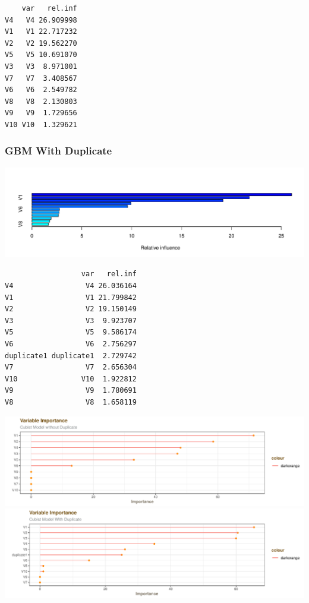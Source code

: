 \documentclass[]{report}
\begin{document}
\begin{verbatim}
    var   rel.inf
V4   V4 26.909998
V1   V1 22.717232
V2   V2 19.562270
V5   V5 10.691070
V3   V3  8.971001
V7   V7  3.408567
V6   V6  2.549782
V8   V8  2.130803
V9   V9  1.729656
V10 V10  1.329621
\end{verbatim}

\hypertarget{gbm-with-duplicate}{%
\subsubsection{GBM With Duplicate}\label{gbm-with-duplicate}}

\includegraphics{Homework-Two_files/figure-latex/kj-8.1da-1.pdf}

\begin{verbatim}
                  var   rel.inf
V4                 V4 26.036164
V1                 V1 21.799842
V2                 V2 19.150149
V3                 V3  9.923707
V5                 V5  9.586174
V6                 V6  2.756297
duplicate1 duplicate1  2.729742
V7                 V7  2.656304
V10               V10  1.922812
V9                 V9  1.780691
V8                 V8  1.658119
\end{verbatim}

\includegraphics{Homework-Two_files/figure-latex/kj-8.1db-1.pdf}
\includegraphics{Homework-Two_files/figure-latex/kj-8.1db-2.pdf}
\end{document}
